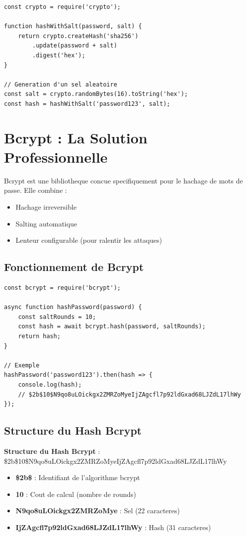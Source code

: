 \documentclass[a4paper,12pt]{book}
\begin{document}
\begin{lstlisting}[style=javascript, caption=Hachage avec sel (manuel - DECONSEILLE)]
const crypto = require('crypto');

function hashWithSalt(password, salt) {
    return crypto.createHash('sha256')
        .update(password + salt)
        .digest('hex');
}

// Generation d'un sel aleatoire
const salt = crypto.randomBytes(16).toString('hex');
const hash = hashWithSalt('password123', salt);
\end{lstlisting}

\section{Bcrypt : La Solution Professionnelle}

Bcrypt est une bibliotheque concue specifiquement pour le hachage de mots de passe. Elle combine :
\begin{itemize}
    \item Hachage irreversible
    \item Salting automatique
    \item Lenteur configurable (pour ralentir les attaques)
\end{itemize}

\subsection{Fonctionnement de Bcrypt}

\begin{lstlisting}[style=javascript, caption=Hachage avec bcrypt]
const bcrypt = require('bcrypt');

async function hashPassword(password) {
    const saltRounds = 10;
    const hash = await bcrypt.hash(password, saltRounds);
    return hash;
}

// Exemple
hashPassword('password123').then(hash => {
    console.log(hash);
    // $2b$10$N9qo8uLOickgx2ZMRZoMyeIjZAgcfl7p92ldGxad68LJZdL17lhWy
});
\end{lstlisting}

\subsection{Structure du Hash Bcrypt}

\begin{definitionbox}
    \textbf{Structure du Hash Bcrypt} : \$2b\$10\$N9qo8uLOickgx2ZMRZoMyeIjZAgcfl7p92ldGxad68LJZdL17lhWy
    \begin{itemize}
        \item \textbf{\$2b\$} : Identifiant de l'algorithme bcrypt
        \item \textbf{10} : Cout de calcul (nombre de rounds)
        \item \textbf{N9qo8uLOickgx2ZMRZoMye} : Sel (22 caracteres)
        \item \textbf{IjZAgcfl7p92ldGxad68LJZdL17lhWy} : Hash (31 caracteres)
    \end{itemize}
\end{definitionbox}
\end{document}
